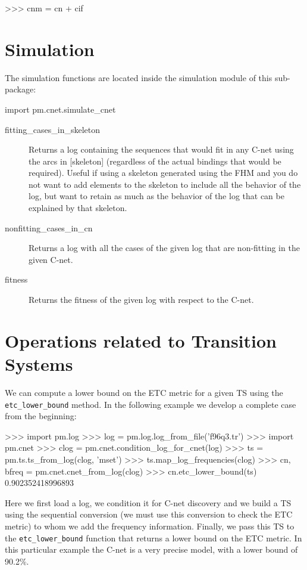 \documentclass[a4paper,10pt]{book}
\begin{document}
\begin{pycode}
>>> cnm = cn + cif
\end{pycode}

\section{Simulation}

The simulation functions are located inside the simulation module of this sub-package:\\
\begin{pycode}
import pm.cnet.simulate_cnet
\end{pycode}

\begin{description}
 \item [fitting\_cases\_in\_skeleton] Returns a log containing the sequences that would fit in any C-net
    using the arcs in [skeleton] (regardless of the actual bindings that would be required). Useful if using a skeleton generated using the FHM and you do not want to add elements to the skeleton to include all the behavior of the log, but want to retain as much as the behavior of the log that can be explained by that skeleton.
\item [nonfitting\_cases\_in\_cn] Returns a log with all the cases of the given log that are non-fitting in the given C-net.
\item [fitness] Returns the fitness of the given log with respect to the C-net.
\end{description}


\section{Operations related to Transition Systems}
We can compute a lower bound on the ETC metric for a given TS using the \texttt{etc\_lower\_bound} method. In the following example we develop a complete case from the beginning:\\

\begin{pycode}
>>> import pm.log
>>> log = pm.log.log_from_file('f96q3.tr')
>>> import pm.cnet
>>> clog = pm.cnet.condition_log_for_cnet(log)
>>> ts = pm.ts.ts_from_log(clog, 'mset')
>>> ts.map_log_frequencies(clog)
>>> cn, bfreq = pm.cnet.cnet_from_log(clog)
>>> cn.etc_lower_bound(ts)
0.902352418996893
\end{pycode}

Here we first load a log, we condition it for C-net discovery and we build a TS using the sequential conversion (we must use this conversion to check the ETC metric) to whom we add the frequency information. Finally, we pass this TS to the \texttt{etc\_lower\_bound} function that returns a lower bound on the ETC metric. In this particular example the C-net is a very precise model, with a lower bound of 90.2\%.
\end{document}
